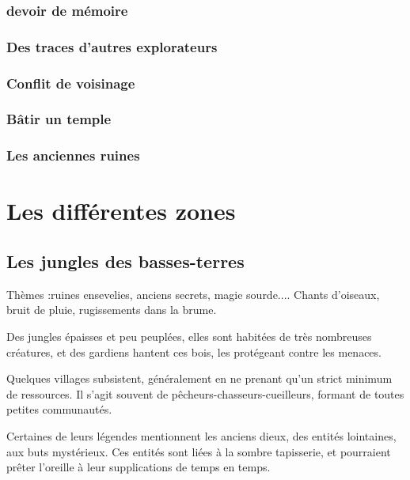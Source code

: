 \documentclass[10pt,a4paper]{book}
\begin{document}
\subsection{devoir de mémoire}

\subsection{Des traces d'autres explorateurs}
\subsection{Conflit de voisinage}
\subsection{Bâtir un temple}
\subsection{Les anciennes ruines}
\chapter{Les différentes zones}
\section{Les jungles des basses-terres}
Thèmes :ruines ensevelies, anciens secrets, magie sourde.... Chants d'oiseaux, bruit de pluie,  rugissements dans la brume.


Des jungles épaisses et peu peuplées, elles sont habitées de très nombreuses créatures, et des gardiens hantent ces bois, les protégeant contre les menaces.

Quelques villages subsistent, généralement en ne prenant qu'un strict minimum de ressources. Il s'agit souvent de pêcheurs-chasseurs-cueilleurs, formant de toutes petites communautés.

Certaines de leurs légendes mentionnent les anciens dieux, des entités lointaines, aux buts mystérieux. Ces entités sont liées à la sombre tapisserie, et pourraient prêter l'oreille à leur supplications de temps en temps.
\end{document}
